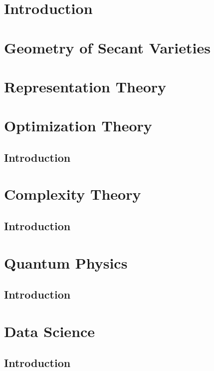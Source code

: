 \documentclass[oneside]{book}
\theoremstyle{plain}
\theoremstyle{definition}
\numberwithin{equation}{subsection}
\begin{document}
\part{Introduction}
\label{part-introduction}


\part{Geometry of Secant Varieties}
\label{part-geometrySecants}


\part{Representation Theory}
\label{part-RepTheory}


\part{Optimization Theory}
\label{part-optimization}

\chapter{Introduction}
\label{optimization-chapter-intro}

\part{Complexity Theory}
\label{part-complexitytheory}

\chapter{Introduction}
\label{complexitytheory-chapter-intro}

\part{Quantum Physics}
\label{part-quantumph}

\chapter{Introduction}
\label{quantumph-chapter-intro}

\part{Data Science}
\label{part-datascience}

\chapter{Introduction}
\label{datascience-chapter-intro}



\end{document}
